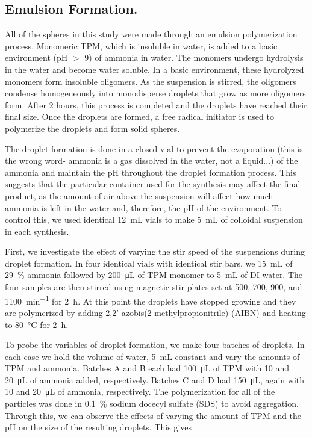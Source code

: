 \subsection{Emulsion Formation.}

All of the spheres in this study were made through an emulsion 
polymerization process. Monomeric TPM, which is insoluble in water, 
is added to a basic environment (pH $>$ \num{9}) of ammonia in water. The 
monomers undergo hydrolysis in the water and become water soluble. 
In a basic environment, these hydrolyzed monomers form insoluble 
oligomers. As the suspension is stirred, the oligomers condense 
homogeneously into monodisperse droplets that grow as more oligomers 
form. After \num{2} hours, this process is completed and the droplets have 
reached their final size. Once the droplets are formed, a free radical 
initiator is used to polymerize the droplets and form solid spheres.

The droplet formation is done in a closed vial to prevent the 
evaporation (this is the wrong word- ammonia is a gas dissolved in the water, not a liquid...) of the ammonia and maintain the pH throughout the droplet 
formation process. This suggests that the particular container used for 
the synthesis may affect the final product, as the amount of air above 
the suspension will affect how much ammonia is left in the water and, 
therefore, the pH of the environment. To control this, we used identical 
\SI{12}{\milli\liter} vials to make \SI{5}{\milli\liter} of colloidal 
suspension in each synthesis.

First, we investigate the effect of varying the stir speed of the 
suspensions during droplet formation. In four identical vials with 
identical stir bars, we \SI{15}{\milli\liter} of 
\SI{29}{\percent} ammonia followed by \SI{200}{\micro\liter} of TPM 
monomer to \SI{5}{\milli\liter} of DI water. The four samples are then stirred 
using magnetic stir plates set at \num{500}, \num{700}, \num{900}, and \SI{1100}{\minute^{-1}} for \SI{2}{\hour}. %
At this point the droplets have stopped growing and they are polymerized 
by adding \num{2},\num{2}'-azobis(\num{2}-methylpropionitrile) (AIBN) and 
heating to \SI{80}{\celsius} for \SI{2}{\hour}. 


To probe the variables of droplet formation, we make four batches of droplets. In each case we hold the volume of water, \SI{5}{\milli \liter} constant 
and vary the amounts of TPM and ammonia. Batches A and B each had 
\SI{100}{\micro\liter} of TPM with \si{10} and \SI{20}{\micro\liter} of 
ammonia added, respectively. Batches C and D had \SI{150}{\micro\liter}, 
again with \si{10} and \SI{20}{\micro\liter} of ammonia, respectively. 
The polymerization for all of the particles was done in \SI{0.1}{\percent} 
sodium docecyl sulfate (SDS) to avoid aggregation.
Through this, we can observe the effects of varying 
the amount of TPM and the pH on the size of the resulting droplets.
This gives 


